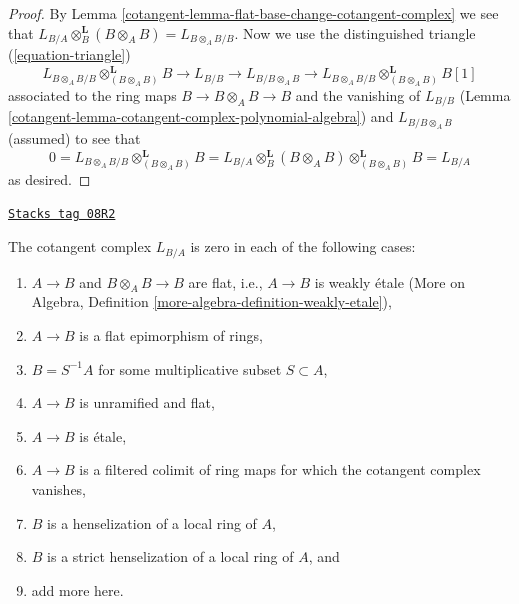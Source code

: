 \begin{proof}

By Lemma \ref{cotangent-lemma-flat-base-change-cotangent-complex} we see that
$L_{B/A} \otimes_B^\mathbf{L} (B \otimes_A B) = L_{B \otimes_A B/B}$.
Now we use the distinguished triangle (\ref{equation-triangle})
$$
L_{B \otimes_A B/B} \otimes^\mathbf{L}_{(B \otimes_A B)} B \to
L_{B/B} \to L_{B/B \otimes_A B} \to
L_{B \otimes_A B/B} \otimes^\mathbf{L}_{(B \otimes_A B)} B[1]
$$
associated to the ring maps $B \to B \otimes_A B \to B$ and the vanishing of
$L_{B/B}$ (Lemma \ref{cotangent-lemma-cotangent-complex-polynomial-algebra}) and
$L_{B/B \otimes_A B}$ (assumed) to see that
$$
0 =
L_{B \otimes_A B/B} \otimes^\mathbf{L}_{(B \otimes_A B)} B =
L_{B/A} \otimes_B^\mathbf{L} (B \otimes_A B)
\otimes^\mathbf{L}_{(B \otimes_A B)} B = L_{B/A}
$$
as desired.
\end{proof}

\begin{lemma}
\label{cotangent-lemma-when-zero}
\href{https://stacks.math.columbia.edu/tag/08R2}{\texttt{Stacks tag 08R2}}

The cotangent complex $L_{B/A}$ is zero in each of the following cases:
\begin{enumerate}
\item $A \to B$ and $B \otimes_A B \to B$ are flat, i.e., $A \to B$
is weakly \'etale
(More on Algebra, Definition \ref{more-algebra-definition-weakly-etale}),
\item $A \to B$ is a flat epimorphism of rings,
\item $B = S^{-1}A$ for some multiplicative subset $S \subset A$,
\item $A \to B$ is unramified and flat,
\item $A \to B$ is \'etale,
\item $A \to B$ is a filtered colimit of ring maps for which
the cotangent complex vanishes,
\item $B$ is a henselization of a local ring of $A$,
\item $B$ is a strict henselization of a local ring of $A$, and
\item add more here.
\end{enumerate}
\end{lemma}

